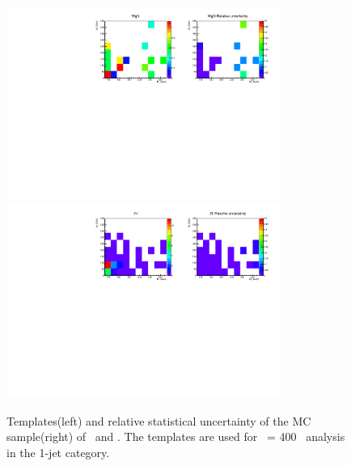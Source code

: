 \begin{figure}[htp]
\centering
\includegraphics[width=0.8\textwidth]{figures/2dtemplate_Wg3l_mH400_1j.pdf}
\includegraphics[width=0.8\textwidth]{figures/2dtemplate_Ztt_mH400_1j.pdf}
\caption{Templates(left) and relative statistical uncertainty of the MC sample(right) 
of \wgammastar\ and \ztt. 
The templates are used for \mHi\ = 400 \GeV\ analysis in the 1-jet category.}
\label{fig:2dtemplate_400_1j_4}
\end{figure} 
